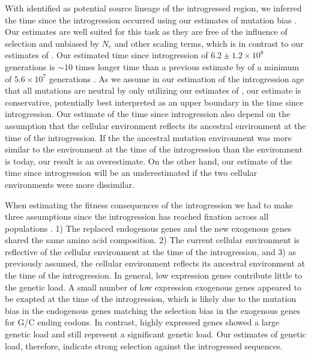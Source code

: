 With \gossypii identified as potential source lineage of the introgressed region, we inferred the time since the introgression occurred using our estimates of mutation bias \DM.
Our \DM estimates are well suited for this task as they are free of the influence of selection and unbiased by $N_e$ and other scaling terms, which is in contrast to our estimates of \DE \citep{gilchrist2015}.
Our estimated time since introgression of $6.2\pm1.2\times 10^8$ generations is $\sim 10$ times longer time than a previous estimate by \citet{friedrich2015} of a minimum of $5.6\times 10^7$ generations .
As we assume in our estimation of the introgression age that all mutations are neutral by only utilizing our estimates of \DM, our estimate is conservative, potentially best interpreted as an upper boundary in the time since introgression.
Our estimate of the time since introgression also depend on the assumption that the \gossypii cellular environment reflects its ancestral environment at the time of the introgression.
If the the ancestral mutation environment was more similar to the \kluyveri environment at the time of the introgression than the \gossypii environment is today, our result is an overestimate.
On the other hand, our estimate of the time since introgression will be an underestimated if the two cellular environments were more dissimilar.

When estimating the fitness consequences of the introgression we had to make three assumptions since the introgression has reached fixation across all \kluyveri populations \citet{friedrich2015}.
1) The replaced endogenous genes and the new exogenous genes shared the same amino acid composition.
2) The current \kluyveri cellular environment is reflective of the cellular environment at the time of the introgression, and 3) as previously assumed, the \gossypii cellular environment reflects its ancestral environment at the time of the introgression.
In general, low expression genes contribute little to the genetic load.
A small number of low expression exogenous genes appeared to be exapted at the time of the introgression, which is likely due to the mutation bias in the endogenous genes matching the selection bias in the exogenous genes for G/C ending codons.
In contrast, highly expressed genes showed a large genetic load and still represent a significant genetic load.
Our estimates of genetic load, therefore, indicate strong selection against the introgressed sequences.

